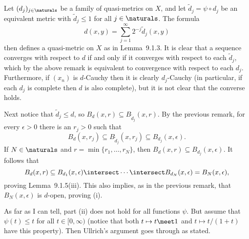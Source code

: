 \documentclass[article, a4paper, 11pt, oneside]{memoir}
\numberwithin{equation}{chapter}
\theoremstyle{nonumberplain}
\begin{document}
\begin{remarkbreak}
    Let $(d_j)_{j \in \naturals}$ be a family of quasi-metrics on $X$, and let $\tilde{d}_j = \psi \circ d_j$ be an equivalent metric with $\tilde{d}_j \leq 1$ for all $j \in \naturals$. The formula
    \begin{equation*}
        d(x,y)
            = \sum_{j=1}^\infty 2^{-j} \tilde{d}_j(x,y)
    \end{equation*}
    then defines a quasi-metric on $X$ as in Lemma~9.1.3. It is clear that a sequence converges with respect to $d$ if and only if it converges with respect to each $\tilde{d}_j$, which by the above remark is equivalent to convergence with respect to each $d_j$. Furthermore, if $(x_n)$ is $d$-Cauchy then it is clearly $d_j$-Cauchy (in particular, if each $d_j$ is complete then $d$ is also complete), but it is not clear that the converse holds.

    Next notice that $\tilde{d}_j \leq d$, so $B_d(x,r) \subseteq B_{\tilde{d}_j}(x,r)$. By the previous remark, for every $\epsilon > 0$ there is an $r_j > 0$ such that
    \begin{equation*}
        B_d(x,r_j)
            \subseteq B_{\tilde{d}_j}(x,r_j)
            \subseteq B_{d_j}(x,\epsilon).
    \end{equation*}
    If $N \in \naturals$ and $r = \min\{r_1, \ldots, r_N\}$, then $B_d(x,r) \subseteq B_{d_j}(x,\epsilon)$. It follows that
    \begin{equation*}
        B_d(x,r)
            \subseteq B_{d_1}(x,\epsilon) \intersect \cdots \intersect B_{d_N}(x,\epsilon)
            = B_N(x,\epsilon),
    \end{equation*}
    proving Lemma~9.1.5(iii). This also implies, as in the previous remark, that $B_N(x,\epsilon)$ is $d$-open, proving (i).

    As far as I can tell, part (ii) does not hold for all functions $\psi$. But assume that $\psi(t) \leq t$ for all $t \in [0,\infty)$ (notice that both $t \mapsto t \meet 1$ and $t \mapsto t/(1+t)$ have this property). Then Ullrich's argument goes through as stated.
\end{remarkbreak}
\end{document}
